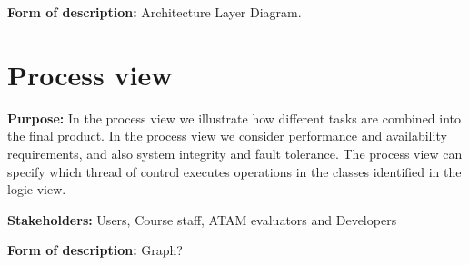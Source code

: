     \noindent\textbf{Form of description:} Architecture Layer Diagram. 
    
    \section{Process view}
    \noindent\textbf{Purpose:} In the process view we illustrate how different tasks are combined into the final product. In the process view we consider performance and availability requirements, and also system integrity and fault tolerance.
    The process view can specify which thread of control executes operations in the classes identified in the logic view. 
    
    \noindent\textbf{Stakeholders:} Users, Course staff, ATAM evaluators and Developers 
    
    \noindent\textbf{Form of description:} Graph?